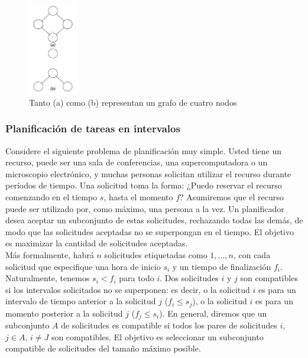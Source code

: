 \documentclass[a4paper]{article}
\begin{document}
\begin{figure}
\centering
\includegraphics[width=0.19\textwidth]{Imagenes-Seccion1/fig1_3.png}
\caption{Tanto (a) como (b) representan un grafo de cuatro nodos}
\end{figure}

\subsubsection*{Planificación de tareas en intervalos}

Considere el siguiente problema de planificación muy simple. Usted tiene un recurso, puede ser una sala de conferencias, una supercomputadora o un microscopio electrónico, y muchas personas solicitan utilizar el recurso durante períodos de tiempo. Una solicitud toma la forma: ¿Puedo reservar el recurso comenzando en el tiempo $s$, hasta el momento $f$? Asumiremos que el recurso puede ser utilizado por, como máximo, una persona a la vez. Un planificador desea aceptar un subconjunto de estas solicitudes, rechazando todas las demás, de modo que las solicitudes aceptadas no se superpongan en el tiempo. El objetivo es maximizar la cantidad de solicitudes aceptadas.\\

Más formalmente, habrá $n$ solicitudes etiquetadas como $1, ..., n$, con cada solicitud que especifique una hora de inicio $s_i$ y un tiempo de finalización $f_i$. Naturalmente, tenemos $s_i<f_i$ para todo $i$. Dos solicitudes $i$ y $j$ son compatibles si los intervalos solicitados no se superponen: es decir, o la solicitud $i$ es para un intervalo de tiempo anterior a la solicitud $j$ ($f_i≤s_j$), o la solicitud $i$ es para un momento posterior a la solicitud $j$ ($f_j≤s_i$). En general, diremos que un subconjunto $A$ de solicitudes es compatible si todos los pares de solicitudes $i$, $j ∈ A$, $i≠J$ son compatibles. El objetivo es seleccionar un subconjunto compatible de solicitudes del tamaño máximo posible.\\
\end{document}

